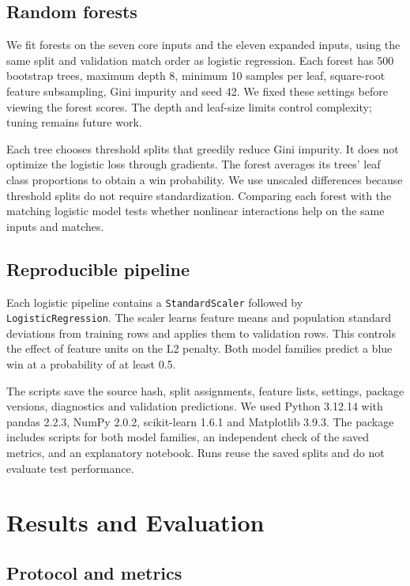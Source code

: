 \documentclass[11pt]{article}
\begin{document}
\subsection{Random forests}

We fit forests on the seven core inputs and the eleven expanded inputs, using the same split and validation match order as logistic regression. Each forest has 500 bootstrap trees, maximum depth 8, minimum 10 samples per leaf, square-root feature subsampling, Gini impurity and seed 42. We fixed these settings before viewing the forest scores. The depth and leaf-size limits control complexity; tuning remains future work.

Each tree chooses threshold splits that greedily reduce Gini impurity. It does not optimize the logistic loss through gradients. The forest averages its trees' leaf class proportions to obtain a win probability. We use unscaled differences because threshold splits do not require standardization. Comparing each forest with the matching logistic model tests whether nonlinear interactions help on the same inputs and matches.

\subsection{Reproducible pipeline}

Each logistic pipeline contains a \texttt{StandardScaler} followed by \texttt{LogisticRegression}. The scaler learns feature means and population standard deviations from training rows and applies them to validation rows. This controls the effect of feature units on the L2 penalty. Both model families predict a blue win at a probability of at least 0.5.

The scripts save the source hash, split assignments, feature lists, settings, package versions, diagnostics and validation predictions. We used Python 3.12.14 with pandas 2.2.3, NumPy 2.0.2, scikit-learn 1.6.1 and Matplotlib 3.9.3. The package includes scripts for both model families, an independent check of the saved metrics, and an explanatory notebook. Runs reuse the saved splits and do not evaluate test performance.

\section{Results and Evaluation}

\subsection{Protocol and metrics}
\end{document}
